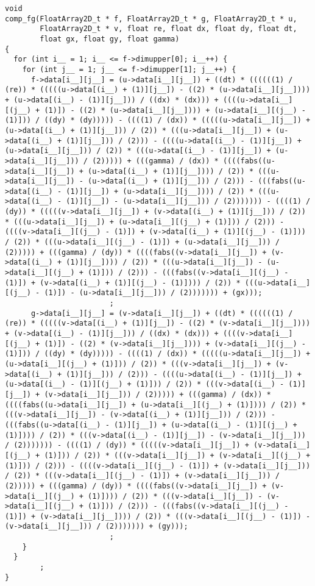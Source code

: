 \begin{lstlisting}
void 
comp_fg(FloatArray2D_t * f, FloatArray2D_t * g, FloatArray2D_t * u, 
        FloatArray2D_t * v, float re, float dx, float dy, float dt, 
        float gx, float gy, float gamma)
{
  for (int i__ = 1; i__ <= f->dimupper[0]; i__++) {
    for (int j__ = 1; j__ <= f->dimupper[1]; j__++) {
      f->data[i__][j__] = (u->data[i__][j__]) + ((dt) * ((((((1) / (re)) * (((((u->data[(i__) + (1)][j__]) - ((2) * (u->data[i__][j__]))) + (u->data[(i__) - (1)][j__])) / ((dx) * (dx))) + ((((u->data[i__][(j__) + (1)]) - ((2) * (u->data[i__][j__]))) + (u->data[i__][(j__) - (1)])) / ((dy) * (dy))))) - ((((1) / (dx)) * (((((u->data[i__][j__]) + (u->data[(i__) + (1)][j__])) / (2)) * (((u->data[i__][j__]) + (u->data[(i__) + (1)][j__])) / (2))) - ((((u->data[(i__) - (1)][j__]) + (u->data[i__][j__])) / (2)) * (((u->data[(i__) - (1)][j__]) + (u->data[i__][j__])) / (2))))) + (((gamma) / (dx)) * ((((fabs((u->data[i__][j__]) + (u->data[(i__) + (1)][j__]))) / (2)) * (((u->data[i__][j__]) - (u->data[(i__) + (1)][j__])) / (2))) - (((fabs((u->data[(i__) - (1)][j__]) + (u->data[i__][j__]))) / (2)) * (((u->data[(i__) - (1)][j__]) - (u->data[i__][j__])) / (2))))))) - ((((1) / (dy)) * (((((v->data[i__][j__]) + (v->data[(i__) + (1)][j__])) / (2)) * (((u->data[i__][j__]) + (u->data[i__][(j__) + (1)])) / (2))) - ((((v->data[i__][(j__) - (1)]) + (v->data[(i__) + (1)][(j__) - (1)])) / (2)) * (((u->data[i__][(j__) - (1)]) + (u->data[i__][j__])) / (2))))) + (((gamma) / (dy)) * ((((fabs((v->data[i__][j__]) + (v->data[(i__) + (1)][j__]))) / (2)) * (((u->data[i__][j__]) - (u->data[i__][(j__) + (1)])) / (2))) - (((fabs((v->data[i__][(j__) - (1)]) + (v->data[(i__) + (1)][(j__) - (1)]))) / (2)) * (((u->data[i__][(j__) - (1)]) - (u->data[i__][j__])) / (2))))))) + (gx)));
                        ;
      g->data[i__][j__] = (v->data[i__][j__]) + ((dt) * ((((((1) / (re)) * (((((v->data[(i__) + (1)][j__]) - ((2) * (v->data[i__][j__]))) + (v->data[(i__) - (1)][j__])) / ((dx) * (dx))) + ((((v->data[i__][(j__) + (1)]) - ((2) * (v->data[i__][j__]))) + (v->data[i__][(j__) - (1)])) / ((dy) * (dy))))) - ((((1) / (dx)) * (((((u->data[i__][j__]) + (u->data[i__][(j__) + (1)])) / (2)) * (((v->data[i__][j__]) + (v->data[(i__) + (1)][j__])) / (2))) - ((((u->data[(i__) - (1)][j__]) + (u->data[(i__) - (1)][(j__) + (1)])) / (2)) * (((v->data[(i__) - (1)][j__]) + (v->data[i__][j__])) / (2))))) + (((gamma) / (dx)) * ((((fabs((u->data[i__][j__]) + (u->data[i__][(j__) + (1)]))) / (2)) * (((v->data[i__][j__]) - (v->data[(i__) + (1)][j__])) / (2))) - (((fabs((u->data[(i__) - (1)][j__]) + (u->data[(i__) - (1)][(j__) + (1)]))) / (2)) * (((v->data[(i__) - (1)][j__]) - (v->data[i__][j__])) / (2))))))) - ((((1) / (dy)) * (((((v->data[i__][j__]) + (v->data[i__][(j__) + (1)])) / (2)) * (((v->data[i__][j__]) + (v->data[i__][(j__) + (1)])) / (2))) - ((((v->data[i__][(j__) - (1)]) + (v->data[i__][j__])) / (2)) * (((v->data[i__][(j__) - (1)]) + (v->data[i__][j__])) / (2))))) + (((gamma) / (dy)) * ((((fabs((v->data[i__][j__]) + (v->data[i__][(j__) + (1)]))) / (2)) * (((v->data[i__][j__]) - (v->data[i__][(j__) + (1)])) / (2))) - (((fabs((v->data[i__][(j__) - (1)]) + (v->data[i__][j__]))) / (2)) * (((v->data[i__][(j__) - (1)]) - (v->data[i__][j__])) / (2))))))) + (gy)));
                        ;
    }
  }
        ;
}
\end{lstlisting}
